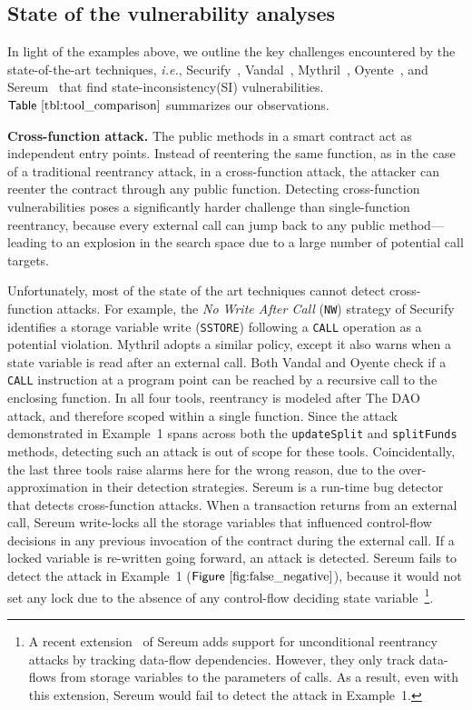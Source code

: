 \documentclass[conference, romanappendices]{tex/IEEEtran}
\theoremstyle{bfnote}
\newcommand{\oyente}{{\sc Oyente}\xspace}
\newcommand{\securify}{{\sc Securify}\xspace}
\newcommand{\sereum}{{\sc Sereum}\xspace}
\newcommand{\vandal}{{\sc Vandal}\xspace}
\newcommand{\smart}{smart contract}
\newcommand{\reentrancy}{{reentrancy}\xspace}
\newcommand{\si}{{state-inconsistency}\xspace}
\newcommand{\mythril}{{\sc Mythril}\xspace}
\newcommand{\ie}{\textit{i.e.}}
\newcommand{\Tbl}[1]{\ensuremath{\sf Table~\ref{#1}}}
\newcommand{\Fig}[1]{\ensuremath{\sf Figure~\ref{#1}}}
\begin{document}
\subsection{\textbf{State of the vulnerability analyses}}
In light of the examples above, we outline the key challenges 
encountered by the state-of-the-art techniques, \ie, \securify~\cite{securify}, \vandal~\cite{vandal}, \mythril~\cite{mythril}, \oyente~\cite{oyente}, and \sereum~\cite{sereum} that find \si (SI) vulnerabilities.
\Tbl{tbl:tool_comparison} summarizes our observations.

\noindent
\textbf{Cross-function attack.}
The public methods in a \smart{} act as independent entry points.
Instead of reentering the same function, as in the case of a traditional \reentrancy attack,
in a cross-function attack, the attacker can reenter the contract through any public function.
Detecting cross-function vulnerabilities poses a significantly harder challenge than single-function \reentrancy, because every external call can jump back to any public method---leading to an explosion in the search space due to a large number of potential call targets.

Unfortunately, most of the state of the art techniques cannot detect cross-function attacks.
For example, the \textit{No Write After Call} (\texttt{NW}) strategy of \securify{} identifies a storage variable write (\texttt{SSTORE}) following a \texttt{CALL} operation as a potential violation.
\mythril{} adopts a similar policy, except it also warns when a state variable is read after an external call.
Both \vandal{} and \oyente{} check if a \texttt{CALL} instruction at a program point can be reached by a recursive call to the enclosing function.
In all four tools, \reentrancy is modeled after The DAO~\cite{dao-attack} attack, and therefore scoped within a single function.
Since the attack demonstrated in Example~1 spans across both the \texttt{updateSplit} and \texttt{splitFunds} methods, detecting such an attack is out of scope for these tools.
Coincidentally, the last three tools raise alarms here for the wrong reason, due to the over-approximation in their detection strategies.
\sereum is a run-time bug detector that detects cross-function attacks.
When a transaction returns from an external call, \sereum write-locks all the storage variables that influenced control-flow decisions in any previous invocation of the contract during the external call.
If a locked variable is re-written going forward, an attack is detected.
\sereum fails to detect the attack in Example~1 (\Fig{fig:false_negative}), because it would not set any lock due to the absence of any control-flow deciding state variable~\footnote{A recent extension~\cite{sereum-repo} of \sereum adds support for unconditional \reentrancy attacks by tracking data-flow dependencies.
However, they only track data-flows from storage variables to the parameters of calls.
As a result, even with this extension, \sereum would fail to detect the attack in Example~1.}.
\end{document}
